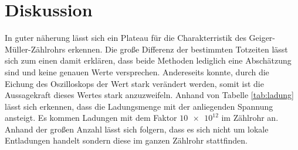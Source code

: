 \section{Diskussion}
\label{sec:Diskussion}
In guter näherung lässt sich ein Plateau für die Charakterristik des Geiger-Müller-Zählrohrs erkennen.
Die große Differenz der bestimmten Totzeiten lässt sich zum einen damit erklären, dass beide Methoden lediglich eine Abschätzung sind und keine genauen Werte versprechen.
Andereseits konnte, durch die Eichung des Oszilloskops der Wert stark verändert werden, somit ist die Aussagekraft dieses Wertes stark anzuzweifeln.
Anhand von Tabelle \ref{tab:ladung} lässt sich erkennen, dass die Ladungsmenge mit der anliegenden Spannung ansteigt.
Es kommen Ladungen mit dem Faktor $\num{10e12}$ im Zählrohr an.
Anhand der großen Anzahl lässt sich folgern, dass es sich nicht um lokale Entladungen handelt sondern diese im ganzen Zählrohr stattfinden.
  
